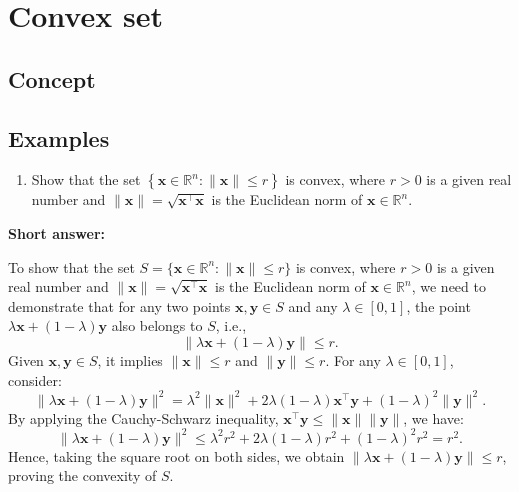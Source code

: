 \section{Convex set}

\subsection{Concept}


\medskip

\subsection{Examples}
\noindent

\noindent
\begin{enumerate}
	
	\item Show that the set \(\left\{\boldsymbol{x} \in \mathbb{R}^{n}:\|\boldsymbol{x}\| \leq r\right\}\) is convex, where \(r>0\) is a given real number and \(\|\boldsymbol{x}\|=\sqrt{\boldsymbol{x}^{\top} \boldsymbol{x}}\) is the Euclidean norm of \(\boldsymbol{x} \in \mathbb{R}^{n} \).
	
\end{enumerate}


\textbf{Short answer:}

To show that the set \(S = \{\boldsymbol{x} \in \mathbb{R}^{n} : \|\boldsymbol{x}\| \leq r\}\) is convex, where \(r>0\) is a given real number and \(\|\boldsymbol{x}\|=\sqrt{\boldsymbol{x}^{\top} \boldsymbol{x}}\) is the Euclidean norm of \(\boldsymbol{x} \in \mathbb{R}^{n}\), we need to demonstrate that for any two points \(\boldsymbol{x}, \boldsymbol{y} \in S\) and any \(\lambda \in [0, 1]\), the point \(\lambda \boldsymbol{x} + (1-\lambda) \boldsymbol{y}\) also belongs to \(S\), i.e., \[ \|\lambda \boldsymbol{x} + (1-\lambda) \boldsymbol{y}\| \leq r. \] Given \(\boldsymbol{x}, \boldsymbol{y} \in S\), it implies \(\|\boldsymbol{x}\| \leq r\) and \(\|\boldsymbol{y}\| \leq r\). For any \(\lambda \in [0, 1]\), consider: \[ \|\lambda \boldsymbol{x} + (1-\lambda) \boldsymbol{y}\|^2 = \lambda^2 \|\boldsymbol{x}\|^2 + 2\lambda(1-\lambda) \boldsymbol{x}^{\top}\boldsymbol{y} + (1-\lambda)^2 \|\boldsymbol{y}\|^2. \] By applying the Cauchy-Schwarz inequality, \(\boldsymbol{x}^{\top}\boldsymbol{y} \leq \|\boldsymbol{x}\|\|\boldsymbol{y}\|\), we have: \[ \|\lambda \boldsymbol{x} + (1-\lambda) \boldsymbol{y}\|^2 \leq \lambda^2 r^2 + 2\lambda(1-\lambda) r^2 + (1-\lambda)^2 r^2 = r^2. \] Hence, taking the square root on both sides, we obtain \(\|\lambda \boldsymbol{x} + (1-\lambda) \boldsymbol{y}\| \leq r\), proving the convexity of \(S\). 

